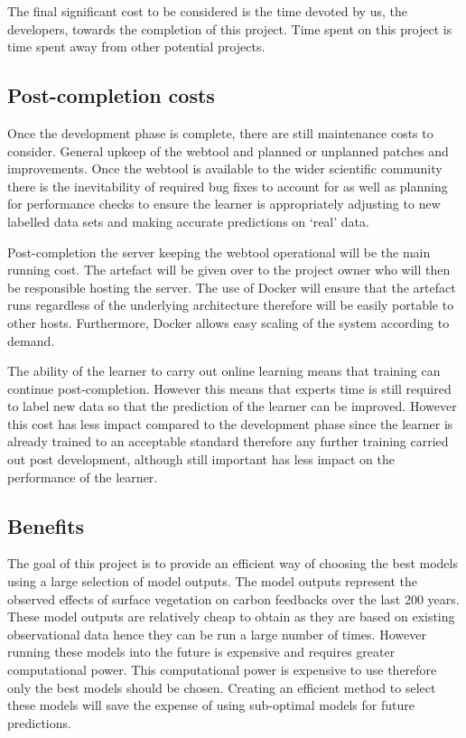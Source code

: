 \documentclass[11pt]{article} %
\numberwithin{equation}{section}
\begin{document}
The final significant cost to be considered is the time devoted by us, the developers, towards the completion of this project. Time spent on this project is time spent away from other potential projects.

\subsection{Post-completion costs}
Once the development phase is complete, there are still maintenance costs to consider. General upkeep of the webtool and planned or unplanned patches and improvements. Once the webtool is available to the wider scientific community there is the inevitability of required bug fixes to account for as well as planning for performance checks to ensure the learner is appropriately adjusting to new labelled data sets and making accurate predictions on ‘real’ data.\par

Post-completion the server keeping the webtool operational will be the main running cost. The artefact will be given over to the project owner who will then be responsible hosting the server. The use of Docker will ensure that the artefact runs regardless of the underlying architecture therefore will be easily portable to other hosts. Furthermore, Docker allows easy scaling of the system according to demand.\par

The ability of the learner to carry out online learning means that training can continue post-completion. However this means that experts time is still required to label new data so that the prediction of the learner can be improved. However this cost has less impact compared to the development phase since the learner is already trained to an acceptable standard therefore any further training carried out post development, although still important has less impact on the performance of the learner.\par

\subsection{Benefits}
The goal of this project is to provide an efficient way of choosing the best models using a large selection of model outputs. The model outputs represent the observed effects of surface vegetation on carbon feedbacks over the last 200 years. These model outputs are relatively cheap to obtain as they are based on existing observational data hence they can be run a large number of times. However running these models into the future is expensive and requires greater computational power. This computational power is expensive to use therefore only the best models should be chosen. Creating an efficient method to select these models will save the expense of using sub-optimal models for future predictions.\par
\end{document}
